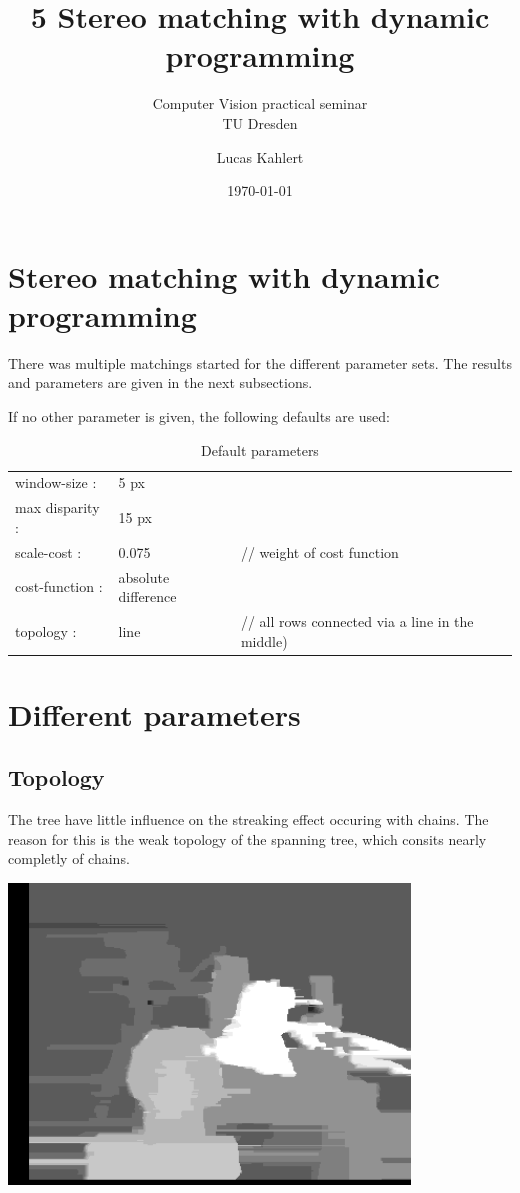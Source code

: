 \documentclass[a4paper]{scrartcl}
\title{5 Stereo matching with dynamic programming}
\subtitle{Computer Vision practical seminar \\ TU Dresden}
\author{Lucas Kahlert}
\date{\today}
\begin{document}
\maketitle

\section{Stereo matching with dynamic programming}

There was multiple matchings started for the different parameter sets.
The results and parameters are given in the next subsections.

If no other parameter is given, the following defaults are used:

\begin{table}
  \begin{tabular}{ l l l }
    window-size   : &  5 px \\
    max disparity : &  15 px \\
    scale-cost    : &  0.075 & // weight of cost function \\
    cost-function : &  absolute difference \\
    topology      : &  line & // all rows connected via a line in the middle) \\
  \end{tabular}
  \caption{Default parameters}
\end{table}


\section{Different parameters}

\subsection{Topology}

The tree have little influence on the streaking effect occuring
with chains. The reason for this is the weak topology of the
spanning tree, which consits nearly completly of chains.

\vspace{1cm}
\begin{minipage}{0.8\textwidth}
  \centering
  \includegraphics[width=0.8\textwidth]{images/line.png}
\end{minipage}
\end{document}

